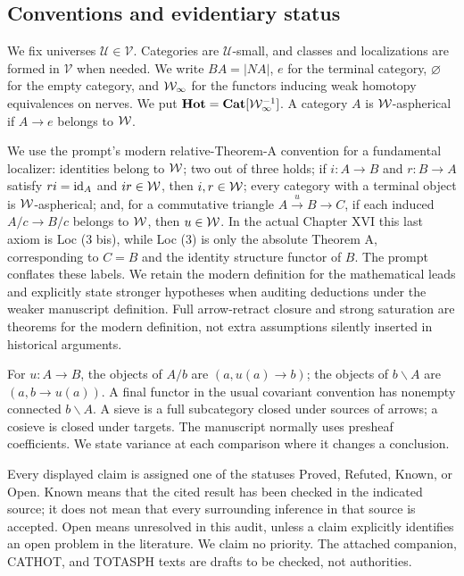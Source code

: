 \subsection*{Conventions and evidentiary status}
We fix universes $\mathcal U\in\mathcal V$. Categories are $\mathcal U$-small, and classes and localizations are formed in $\mathcal V$ when needed. We write $BA=|NA|$, $e$ for the terminal category, $\varnothing$ for the empty category, and $\mathcal{W}_{\infty}$ for the functors inducing weak homotopy equivalences on nerves. We put $\mathbf{Hot}=\mathbf{Cat}[\mathcal{W}_{\infty}^{-1}]$. A category $A$ is $\mathcal{W}$-aspherical if $A\to e$ belongs to $\mathcal{W}$.

We use the prompt's modern relative-Theorem-A convention for a fundamental localizer: identities belong to $\mathcal{W}$; two out of three holds; if $i:A\to B$ and $r:B\to A$ satisfy $ri=\mathrm{id}_A$ and $ir\in\mathcal{W}$, then $i,r\in\mathcal{W}$; every category with a terminal object is $\mathcal{W}$-aspherical; and, for a commutative triangle $A\xrightarrow{u}B\to C$, if each induced $A/c\to B/c$ belongs to $\mathcal{W}$, then $u\in\mathcal{W}$. In the actual Chapter XVI this last axiom is Loc (3 bis), while Loc (3) is only the absolute Theorem A, corresponding to $C=B$ and the identity structure functor of $B$. The prompt conflates these labels. We retain the modern definition for the mathematical leads and explicitly state stronger hypotheses when auditing deductions under the weaker manuscript definition. Full arrow-retract closure and strong saturation are theorems for the modern definition, not extra assumptions silently inserted in historical arguments.

For $u:A\to B$, the objects of $A/b$ are $(a,u(a)\to b)$; the objects of $b\backslash A$ are $(a,b\to u(a))$. A final functor in the usual covariant convention has nonempty connected $b\backslash A$. A sieve is a full subcategory closed under sources of arrows; a cosieve is closed under targets. The manuscript normally uses presheaf coefficients. We state variance at each comparison where it changes a conclusion.

Every displayed claim is assigned one of the statuses Proved, Refuted, Known, or Open. Known means that the cited result has been checked in the indicated source; it does not mean that every surrounding inference in that source is accepted. Open means unresolved in this audit, unless a claim explicitly identifies an open problem in the literature. We claim no priority. The attached companion, CATHOT, and TOTASPH texts are drafts to be checked, not authorities.
